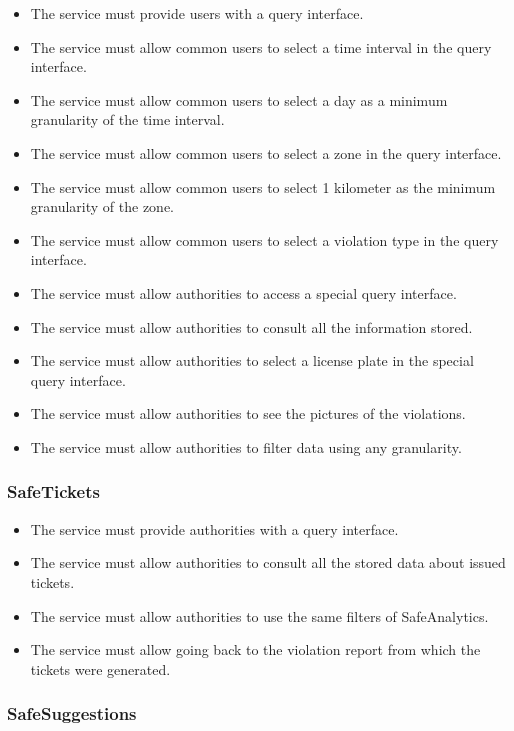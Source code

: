 \documentclass[./main.tex]{subfiles}
\begin{document}
\begin{itemize}
\item
  The service must provide users with a query interface.
\item
  The service must allow common users to select a time interval in the
  query interface.
\item
  The service must allow common users to select a day as a minimum
  granularity of the time interval.
\item
  The service must allow common users to select a zone in the query
  interface.
\item
  The service must allow common users to select 1 kilometer as the
  minimum granularity of the zone.
\item
  The service must allow common users to select a violation type in the
  query interface.
\item
  The service must allow authorities to access a special query
  interface.
\item
  The service must allow authorities to consult all the information
  stored.
\item
  The service must allow authorities to select a license plate in the
  special query interface.
\item
  The service must allow authorities to see the pictures of the
  violations.
\item
  The service must allow authorities to filter data using any
  granularity.
\end{itemize}

\subsubsection{SafeTickets}

\begin{itemize}
\item
  The service must provide authorities with a query interface.
\item
  The service must allow authorities to consult all the stored data
  about issued tickets.
\item
  The service must allow authorities to use the same filters of
  SafeAnalytics.
\item
  The service must allow going back to the violation report from which
  the tickets were generated.
\end{itemize}

\subsubsection{SafeSuggestions}
\end{document}
